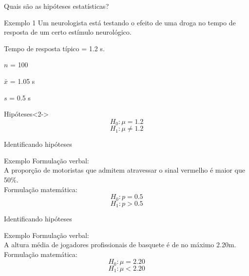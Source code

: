 \documentclass{beamer}
\begin{document}
\begin{frame}{{\footnotesize Quais são as hipóteses estatísticas?}}
  \begin{exampleblock}{Exemplo 1}
    \scriptsize
    Um neurologista está testando o efeito de uma droga no tempo de
    resposta de um certo estímulo neurológico.

    \smallskip
    Tempo de resposta típico = \alert{1.2 s}.

    \smallskip
    $n$ = \alert{100}

    $\bar{x}$ = \alert{1.05 s}

    $s$ = \alert{0.5 s}
  \end{exampleblock}
  \begin{exampleblock}{Hipóteses}<2->
    \begin{displaymath}
      H_0: \mu=1.2
    \end{displaymath}
    \begin{displaymath}
      H_1: \mu \ne 1.2
    \end{displaymath}
  \end{exampleblock}
\end{frame}

\begin{frame}{Identificando hipóteses}
  \begin{exampleblock}{Exemplo}
    Formulação verbal:\\
    A proporção de motoristas que admitem atravessar o sinal vermelho
    é maior que 50\%.\\
    \bigskip
    Formulação matemática:\\
    \begin{displaymath}
      H_0: p=0.5
    \end{displaymath}
    \begin{displaymath}
      H_1: p>0.5
    \end{displaymath}
  \end{exampleblock}
\end{frame}

\begin{frame}{Identificando hipóteses}
  \begin{exampleblock}{Exemplo}
    Formulação verbal:\\
    A altura média de jogadores profissionais de basquete é de no
    máximo 2.20m.\\
    \bigskip
    Formulação matemática:\\
    \begin{displaymath}
      H_0: \mu = 2.20
    \end{displaymath}
    \begin{displaymath}
      H_1: \mu < 2.20
    \end{displaymath}
  \end{exampleblock}
\end{frame}
\end{document}
